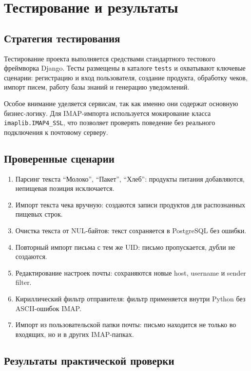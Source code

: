 \documentclass[14pt,a4paper]{extreport}
\renewcommand{\thechapter}{\arabic{chapter}}
\begin{document}
\newpage
\chapter[Глава \thechapter Тестирование и результаты]{Тестирование и результаты}

\section{Стратегия тестирования}

Тестирование проекта выполняется средствами стандартного тестового фреймворка Django. Тесты размещены в каталоге \texttt{tests} и охватывают ключевые сценарии: регистрацию и вход пользователя, создание продукта, обработку чеков, импорт писем, работу базы знаний и генерацию уведомлений.

Особое внимание уделяется сервисам, так как именно они содержат основную бизнес-логику. Для IMAP-импорта используется мокирование класса \texttt{imaplib.IMAP4\_SSL}, что позволяет проверять поведение без реального подключения к почтовому серверу.

\section{Проверенные сценарии}

\begin{enumerate}
  \item Парсинг текста ``Молоко'', ``Пакет'', ``Хлеб'': продукты питания добавляются, непищевая позиция исключается.
  \item Импорт текста чека вручную: создаются записи продуктов для распознанных пищевых строк.
  \item Очистка текста от NUL-байтов: текст сохраняется в PostgreSQL без ошибки.
  \item Повторный импорт письма с тем же UID: письмо пропускается, дубли не создаются.
  \item Редактирование настроек почты: сохраняются новые host, username и sender filter.
  \item Кириллический фильтр отправителя: фильтр применяется внутри Python без ASCII-ошибок IMAP.
  \item Импорт из пользовательской папки почты: письмо находится не только во входящих, но и в других IMAP-папках.
\end{enumerate}

\section{Результаты практической проверки}
\end{document}
